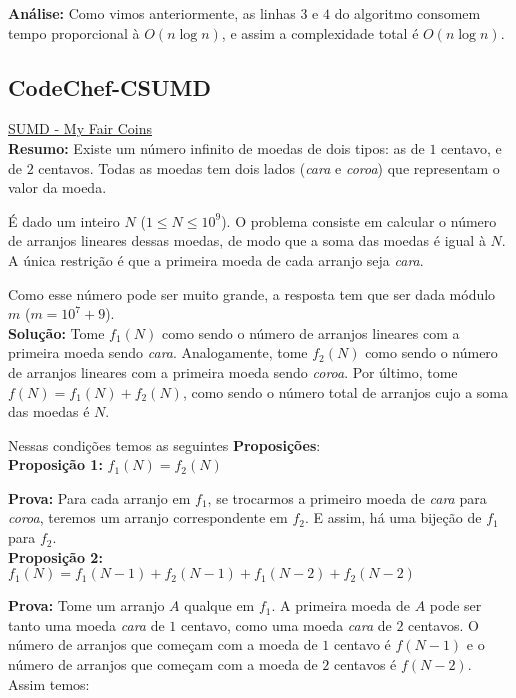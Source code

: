 \textbf{Análise:}
Como vimos anteriormente, as linhas $3$ e $4$ do algoritmo consomem tempo proporcional à $O(n \log n)$, e assim a complexidade total é $O(n \log n)$.




\subsection{CodeChef-CSUMD}
\href{https://www.codechef.com/JULY12/problems/CSUMD}{SUMD - My Fair Coins}\\


\textbf{Resumo:}
Existe um número infinito de moedas de dois tipos: as de $1$ centavo, e de $2$ centavos. 
Todas as moedas tem dois lados (\textit{cara} e \textit{coroa}) que representam o valor da moeda. 

É dado um inteiro $N$ ($1 \leq N \leq 10^9$). 
O problema consiste em calcular o número de arranjos lineares dessas moedas, de modo que a soma das moedas é igual à $N$.
A única restrição é que a primeira moeda de cada arranjo seja \textit{cara}. 

Como esse número pode ser muito grande, a resposta tem que ser dada módulo $m$ ($m = 10^7+9$).
\\

\textbf{Solução:}
Tome $f_1(N)$ como sendo o número de arranjos lineares com a primeira moeda sendo \textit{cara}. Analogamente, tome $f_2(N)$
como sendo o número de arranjos lineares com a primeira moeda sendo \textit{coroa}. Por último, tome $f(N) = f_1(N)+f_2(N)$, como
sendo o número total de arranjos cujo a soma das moedas é $N$.

Nessas condições temos as seguintes \textbf{Proposições}:
\\

\textbf{Proposição 1:} $f_1(N) = f_2(N)$

\textbf{Prova:} Para cada arranjo em $f_1$, se trocarmos a primeiro moeda de \textit{cara} para \textit{coroa}, teremos um arranjo correspondente em $f_2$. E assim, há uma bijeção de $f_1$ para $f_2$.
\\

\textbf{Proposição 2:} $f_1(N) = f_1(N-1) + f_2(N-1) + f_1(N-2) + f_2(N-2)$

\textbf{Prova: }Tome um arranjo $A$ qualque em $f_1$. A primeira moeda de $A$ pode ser tanto uma moeda \textit{cara} de $1$ centavo,
como uma moeda \textit{cara} de $2$ centavos. O número de arranjos que começam com a moeda de $1$ centavo é $f(N-1)$ e o número de arranjos que começam com a moeda de $2$ centavos é $f(N-2)$. Assim temos:

